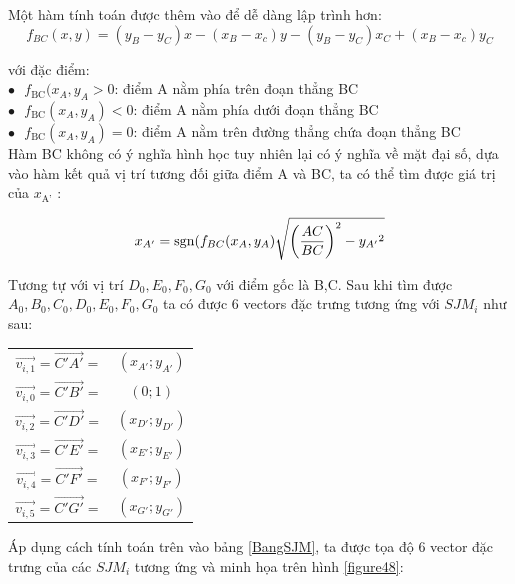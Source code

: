 Một hàm tính toán được thêm vào để dễ dàng lập trình hơn:
\begin{equation}
{f_{BC}}(x,y) = ({y_B} - {y_C})x - ({x_B} - {x_c})y - ({y_B} - {y_C}){x_C} + ({x_B} - {x_c}){y_C}
\end{equation}

với đặc điểm:\\

$\bullet \text{   }  f_\text{BC}(x_A,y_A > 0$: điểm A nằm phía trên đoạn thẳng BC\\

$\bullet \text{   }  f_\text{BC}(x_A,y_A)< 0$: điểm A nằm phía dưới đoạn thẳng BC\\

$\bullet \text{   } f_\text{BC}(x_A,y_A)= 0$: điểm A nằm trên đường thẳng chứa đoạn thẳng BC\\

Hàm BC không có ý nghĩa hình học tuy nhiên lại có ý nghĩa về mặt đại số, dựa vào hàm kết quả vị trí tương đối giữa điểm A và BC, ta có thể tìm được giá trị của $x_\text{A'}$ :

\begin{equation}
{x_{A'}} = {\mathop{\rm sgn}} ({f_{BC}}({x_A},{y_A})\sqrt {{{\left( {\frac{{AC}}{{BC}}} \right)}^2} - {y_{A'}}^2} 
\end{equation}

Tương tự với vị trí $D_0, E_0, F_0, G_0$ với điểm gốc là B,C. Sau khi tìm được $A_0, B_0, C_0, D_0, E_0, F_0, G_0$ ta có được 6 vectors đặc trưng tương ứng với $SJM_i$ như sau:

\begin{tabular}{c c}
$\overrightarrow {{v_{i,1}}}  = \overrightarrow {C'A'}  = $&$({x_{A'}};{y_{A'}})$ \\ 
$\overrightarrow {{v_{i,0}}}  = \overrightarrow {C'B'}  = $&$(0;1)$ \\ 
$\overrightarrow {{v_{i,2}}}  = \overrightarrow {C'D'}  = $&$({x_{D'}};{y_{D'}})$ \\ 
$\overrightarrow {{v_{i,3}}}  = \overrightarrow {C'E'}  = $&$({x_{E'}};{y_{E'}})$ \\ 
$\overrightarrow {{v_{i,4}}}  = \overrightarrow {C'F'}  = $&$({x_{F'}};{y_{F'}})$ \\ 
$\overrightarrow {{v_{i,5}}}  = \overrightarrow {C'G'}  = $&$({x_{G'}};{y_{G'}})$ \\ 


\end{tabular} 

Áp dụng cách tính toán trên vào bảng \ref{BangSJM}, ta được tọa độ 6 vector đặc trưng của các $SJM_i$ tương ứng và minh họa trên hình \ref{figure48}:

